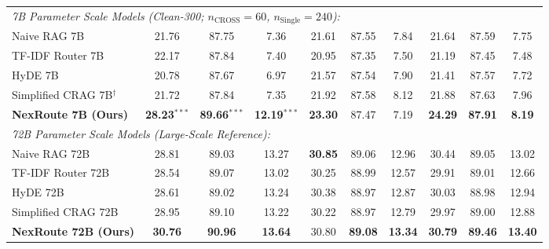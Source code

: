 \documentclass[a4paper,fleql,doubleblind]{cas-sc}
\begin{document}
\begin{center}
{\begin{tabular}{lccccccccc}
\midrule
\multicolumn{10}{l}{\textit{7B Parameter Scale Models (Clean-300; $n_{\text{CROSS}}{=}60$, $n_{\text{Single}}{=}240$):}} \\
Naive RAG 7B
  & 21.76 & 87.75 & 7.36
  & 21.61 & 87.55 & 7.84
  & 21.64 & 87.59 & 7.75 \\
TF-IDF Router 7B
  & 22.17 & 87.84 & 7.40
  & 20.95 & 87.35 & 7.50
  & 21.19 & 87.45 & 7.48 \\
HyDE 7B
  & 20.78 & 87.67 & 6.97
  & 21.57 & 87.54 & 7.90
  & 21.41 & 87.57 & 7.72 \\
Simplified CRAG 7B$^\dagger$
  & 21.72 & 87.84 & 7.35
  & 21.92 & 87.58 & 8.12
  & 21.88 & 87.63 & 7.96 \\
\textbf{NexRoute 7B (Ours)}
  & \textbf{28.23}$^{***}$ & \textbf{89.66}$^{***}$ & \textbf{12.19}$^{***}$
  & \textbf{23.30} & 87.47 & 7.19
  & \textbf{24.29} & \textbf{87.91} & \textbf{8.19} \\
\midrule
\multicolumn{10}{l}{\textit{72B Parameter Scale Models (Large-Scale Reference):}} \\
Naive RAG 72B
  & 28.81 & 89.03 & 13.27
  & \textbf{30.85} & 89.06 & 12.96
  & 30.44 & 89.05 & 13.02 \\
TF-IDF Router 72B
  & 28.54 & 89.07 & 13.02
  & 30.25 & 88.99 & 12.57
  & 29.91 & 89.01 & 12.66 \\
HyDE 72B
  & 28.61 & 89.02 & 13.24
  & 30.38 & 88.97 & 12.87
  & 30.03 & 88.98 & 12.94 \\
Simplified CRAG 72B
  & 28.95 & 89.10 & 13.22
  & 30.22 & 88.97 & 12.79
  & 29.97 & 89.00 & 12.88 \\
\textbf{NexRoute 72B (Ours)}
  & \textbf{30.76} & \textbf{90.96} & \textbf{13.64}
  & 30.80 & \textbf{89.08} & \textbf{13.34}
  & \textbf{30.79} & \textbf{89.46} & \textbf{13.40} \\
\bottomrule
\end{tabular}%
}
\endgroup
\end{center}
\vspace{6pt plus 4pt minus 3pt}
\end{document}
